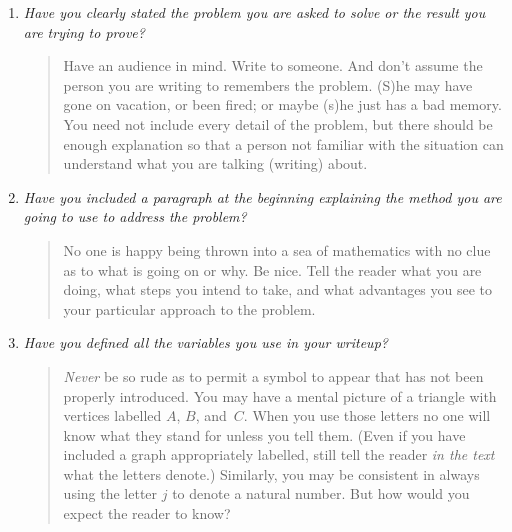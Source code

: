  \begin{enumerate}
   \item \emph{Have you clearly stated the problem you are asked to solve or the result you
are trying to prove?}

\vspace{10pt}

     \begin{quote}
Have an audience in mind.  Write to someone.  And don't assume the person you are writing to
remembers the problem.  (S)he may have gone on vacation, or been fired; or maybe (s)he just
has a bad memory.  You need not include every detail of the problem, but there should be
enough explanation so that a person not familiar with the situation can understand what you
are talking (writing) about.
      \end{quote}

\vspace{15pt}

   \item \emph{Have you included a paragraph at the beginning explaining the method you are
going to use to address the problem?}

\vspace{10pt}

     \begin{quote}
No one is happy being thrown into a sea of mathematics with no clue as to what is going on or
why.  Be nice.  Tell the reader what you are doing, what steps you intend to take, and what
advantages you see to your particular approach to the problem.
     \end{quote}

\vspace{15pt}

   \item \emph{Have you defined all the variables you use in your writeup?}

\vspace{10pt}
      \begin{quote}
\emph{Never} be so rude as to permit a symbol to appear that has not been properly introduced.
You may have a mental picture of a triangle with vertices labelled $A$, $B$, and~$C$.  When
you use those letters no one will know what they stand for unless you tell them.  (Even if you
have included a graph appropriately labelled, still tell the reader \emph{in the text} what
the letters denote.) Similarly, you may be consistent in always using the letter $j$ to denote
a natural number.  But how would you expect the reader to know?


\end{quote}
\end{enumerate}
